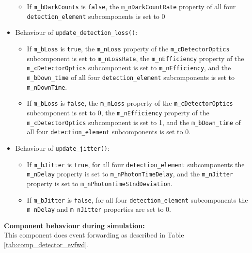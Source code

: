\begin{itemize}
\begin{itemize}
\item If \texttt{m\_bDarkCounts} is \texttt{false}, the \texttt{m\_nDarkCountRate} property of all four \texttt{detection\_element} subcomponents is set to 0

\end{itemize}

\item Behaviour of \texttt{update\_detection\_loss()}:

\begin{itemize}

\item If \texttt{m\_bLoss} is \texttt{true}, the \texttt{m\_nLoss} property of the \texttt{m\_cDetectorOptics} subcomponent is set to \texttt{m\_nLossRate}, the \texttt{m\_nEfficiency} property of the \texttt{m\_cDetectorOptics} subcomponent is set to \texttt{m\_nEfficiency}, and the \texttt{m\_bDown\_time} of all four \texttt{detection\_element} subcomponents is set to \texttt{m\_nDownTime}.

\item If \texttt{m\_bLoss} is \texttt{false}, the \texttt{m\_nLoss} property of the \texttt{m\_cDetectorOptics} subcomponent is set to 0, the \texttt{m\_nEfficiency} property of the \texttt{m\_cDetectorOptics} subcomponent is set to 1, and the \texttt{m\_bDown\_time} of all four \texttt{detection\_element} subcomponents is set to 0.

\end{itemize}

\item Behaviour of \texttt{update\_jitter()}:

\begin{itemize}

\item If \texttt{m\_bJitter} is \texttt{true}, for all four \texttt{detection\_element} subcomponents the \texttt{m\_nDelay} property is set to \texttt{m\_nPhotonTimeDelay}, and the \texttt{m\_nJitter} property is set to \texttt{m\_nPhotonTimeStndDeviation}.

\item If \texttt{m\_bJitter} is \texttt{false}, for all four \texttt{detection\_element} subcomponents the \texttt{m\_nDelay} and \texttt{m\_nJitter} properties are set to 0.

\end{itemize}

\end{itemize}
\noindent
\textbf{Component behaviour during simulation:}\\
This component does event forwarding as described in Table \ref{tab:comp_detector_evfwd}.

